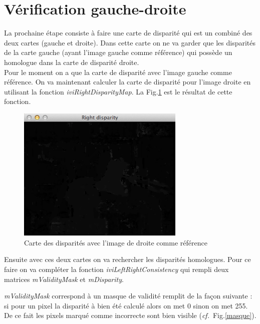 \documentclass[a4paper,10pt]{article}
\begin{document}
\section{V\'erification gauche-droite}

La prochaine \'etape consiste \`a faire une carte de disparit\'e qui est un combin\'e des deux cartes (gauche et droite). Dans cette carte on ne va garder que les disparit\'es de la carte gauche (ayant l'image gauche comme r\'ef\'erence) qui poss\`ede un homologue dans la carte de disparit\'e droite. \\

Pour le moment on a que la carte de disparit\'e avec l'image gauche comme r\'ef\'erence. On va maintenant calculer la carte de disparit\'e pour l'image droite en utilisant la fonction \emph{iviRightDisparityMap}. La Fig.\ref{disparite_img_d} est le r\'esultat de cette fonction.

\begin{figure}[ht]
\begin{center}
	\includegraphics[width=8cm]{images/disparite_img_d.png}
\end{center}
	\caption{Carte des disparit\'es avec l'image de droite comme r\'ef\'erence}
	\label{disparite_img_d}
\end{figure}

\newpage

Ensuite avec ces deux cartes on va rechercher les disparit\'es homologues. Pour ce faire on va compl\'eter la fonction \emph{iviLeftRightConsistency} qui rempli deux matrices \emph{mValidityMask} et  \emph{mDisparity}.

 \emph{mValidityMask} correspond \`a un masque de validit\'e remplit de la fa\c con suivante : si pour un pixel la disparit\'e \`a bien \'et\'e calcul\'e alors on met 0 sinon on met 255. De ce fait les pixels marqu\'e comme incorrecte sont bien visible (\emph{cf.}~Fig.\ref{masque}).
\end{document}
